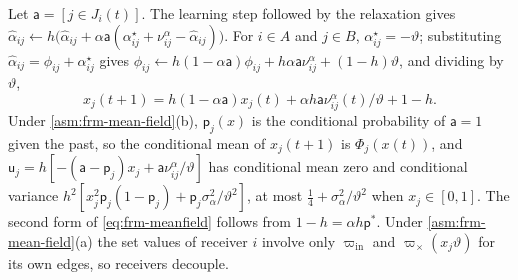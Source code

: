 Let $\mathsf a=[j\in J_i(t)]$. The learning step followed by the relaxation gives $\hat\alpha_{ij}\leftarrow h\bigl(\hat\alpha_{ij}+\alpha\mathsf a(\alpha^\star_{ij}+\nu^\alpha_{ij}-\hat\alpha_{ij})\bigr)$. For $i\in A$ and $j\in B$, $\alpha^\star_{ij}=-\vartheta$; substituting $\hat\alpha_{ij}=\phi_{ij}+\alpha^\star_{ij}$ gives $\phi_{ij}\leftarrow h(1-\alpha\mathsf a)\phi_{ij}+h\alpha\mathsf a\nu^\alpha_{ij}+(1-h)\vartheta$, and dividing by $\vartheta$,
\begin{equation*}
x_j(t+1)=h(1-\alpha\mathsf a)x_j(t)+\alpha h\mathsf a\nu^\alpha_{ij}(t)/\vartheta+1-h.
\end{equation*}
Under \cref{asm:frm-mean-field}(b), $\mathsf p_j(x)$ is the conditional probability of $\mathsf a=1$ given the past, so the conditional mean of $x_j(t+1)$ is $\Phi_j(x(t))$, and $\mathsf u_j=h[-(\mathsf a-\mathsf p_j)x_j+\mathsf a\nu^\alpha_{ij}/\vartheta]$ has conditional mean zero and conditional variance $h^2[x_j^2\mathsf p_j(1-\mathsf p_j)+\mathsf p_j\sigma_\alpha^2/\vartheta^2]$, at most $\frac14+\sigma_\alpha^2/\vartheta^2$ when $x_j\in[0,1]$. The second form of \eqref{eq:frm-meanfield} follows from $1-h=\alpha h\mathsf p^\ast$. Under \cref{asm:frm-mean-field}(a) the set values of receiver $i$ involve only $\varpi_{\mathrm{in}}$ and $\varpi_\times(x_j\vartheta)$ for its own edges, so receivers decouple.

